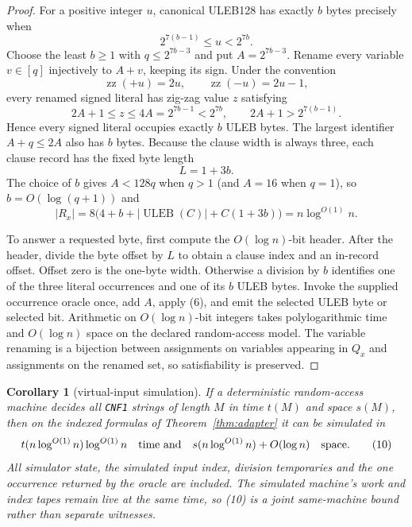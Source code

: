 \documentclass[11pt]{article}
\newtheorem{corollary}[theorem]{Corollary}
\begin{document}
\begin{proof}
For a positive integer $u$, canonical ULEB128 has exactly $b$ bytes precisely
when
\[
 2^{7(b-1)}\le u<2^{7b}.                                    \tag{5}
\]
Choose the least $b\ge1$ with $q\le2^{7b-3}$ and put
$A=2^{7b-3}$.  Rename every variable $v\in[q]$ injectively to $A+v$, keeping
its sign.  Under the convention
\[
 \operatorname{zz}(+u)=2u,
 \qquad
 \operatorname{zz}(-u)=2u-1,                                \tag{6}
\]
every renamed signed literal has zig-zag value $z$ satisfying
\[
 2A+1\le z\le4A=2^{7b-1}<2^{7b},
 \qquad 2A+1>2^{7(b-1)}.                                    \tag{7}
\]
Hence every signed literal occupies exactly $b$ ULEB bytes.  The largest
identifier $A+q\le2A$ also has $b$ bytes.  Because the clause width is always
three, each clause record has the fixed byte length
\[
 L=1+3b.                                                     \tag{8}
\]
The choice of $b$ gives $A<128q$ when $q>1$ (and $A=16$ when $q=1$), so
$b=O(\log(q+1))$ and
\[
 |R_x|=8\bigl(4+b+|\operatorname{ULEB}(C)|+C(1+3b)\bigr)
       =n\log^{O(1)}n.                                      \tag{9}
\]

To answer a requested byte, first compute the $O(\log n)$-bit header.  After
the header, divide the byte offset by $L$ to obtain a clause index and an
in-record offset.  Offset zero is the one-byte width.  Otherwise a division
by $b$ identifies one of the three literal occurrences and one of its $b$
ULEB bytes.  Invoke the supplied occurrence oracle once, add $A$, apply
(6), and emit the selected ULEB byte or selected bit.  Arithmetic on
$O(\log n)$-bit integers takes polylogarithmic time and $O(\log n)$ space on
the declared random-access model.  The variable renaming is a bijection
between assignments on variables appearing in $Q_x$ and assignments on the
renamed set, so satisfiability is preserved.
\end{proof}

\begin{corollary}[virtual-input simulation]
If a deterministic random-access machine decides all \texttt{CNF1} strings
of length $M$ in time $t(M)$ and space $s(M)$, then on the indexed formulas
of Theorem~\ref{thm:adapter} it can be simulated in
\[
 t(n\log^{O(1)}n)\log^{O(1)}n
 \quad\hbox{time and}\quad
 s(n\log^{O(1)}n)+O(\log n)\quad\hbox{space}.                \tag{10}
\]
All simulator state, the simulated input index, division temporaries and the
one occurrence returned by the oracle are included.  The simulated machine's
work and index tapes remain live at the same time, so (10) is a joint
same-machine bound rather than separate witnesses.
\end{corollary}
\end{document}

